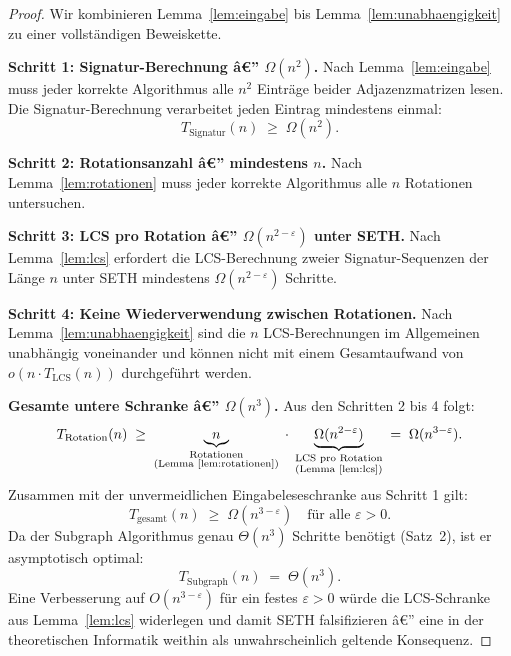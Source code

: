 ﻿\documentclass[a4paper,12pt]{article}
\theoremstyle{definition}
\begin{document}
\begin{proof}
Wir kombinieren Lemma~\ref{lem:eingabe} bis Lemma~\ref{lem:unabhaengigkeit} zu einer vollständigen Beweiskette.

\textbf{Schritt 1: Signatur-Berechnung â€” $\Omega(n^2)$.}
Nach Lemma~\ref{lem:eingabe} muss jeder korrekte Algorithmus alle $n^2$ Einträge beider Adjazenzmatrizen lesen.
Die Signatur-Berechnung verarbeitet jeden Eintrag mindestens einmal:
\[
	T_{\text{Signatur}}(n) \;\geq\; \Omega(n^2).
\]

\textbf{Schritt 2: Rotationsanzahl â€” mindestens $n$.}
Nach Lemma~\ref{lem:rotationen} muss jeder korrekte Algorithmus alle $n$ Rotationen untersuchen.

\textbf{Schritt 3: LCS pro Rotation â€” $\Omega(n^{2-\varepsilon})$ unter SETH.}
Nach Lemma~\ref{lem:lcs} erfordert die LCS-Berechnung zweier Signatur-Sequenzen der Länge $n$
unter SETH mindestens $\Omega(n^{2-\varepsilon})$ Schritte.

\textbf{Schritt 4: Keine Wiederverwendung zwischen Rotationen.}
Nach Lemma~\ref{lem:unabhaengigkeit} sind die $n$ LCS-Berechnungen im Allgemeinen
unabhängig voneinander und können nicht mit einem Gesamtaufwand von $o(n \cdot T_{\mathrm{LCS}}(n))$ durchgeführt werden.

\textbf{Gesamte untere Schranke â€” $\Omega(n^3)$.}
Aus den Schritten 2 bis 4 folgt:
\[
	T_{\text{Rotation}}(n)
	\;\geq\;
	\underbrace{n}_{\substack{\text{Rotationen}\\\text{(Lemma \ref{lem:rotationen})}}}
	\;\cdot\;
	\underbrace{\Omega(n^{2-\varepsilon})}_{\substack{\text{LCS pro Rotation}\\\text{(Lemma \ref{lem:lcs})}}}
	\;=\; \Omega(n^{3-\varepsilon}).
\]
Zusammen mit der unvermeidlichen Eingabeleseschranke aus Schritt 1 gilt:
\[
	T_{\text{gesamt}}(n) \;\geq\; \Omega(n^{3-\varepsilon}) \quad \text{für alle } \varepsilon > 0.
\]
Da der Subgraph Algorithmus genau $\Theta(n^3)$ Schritte benötigt (Satz~2), ist er asymptotisch optimal:
\[
	T_{\text{Subgraph}}(n) \;=\; \Theta(n^3).
\]
Eine Verbesserung auf $O(n^{3-\varepsilon})$ für ein festes $\varepsilon > 0$ würde die LCS-Schranke aus Lemma~\ref{lem:lcs} widerlegen und damit SETH falsifizieren â€” eine in der theoretischen Informatik weithin als unwahrscheinlich geltende Konsequenz.
\end{proof}
\end{document}
